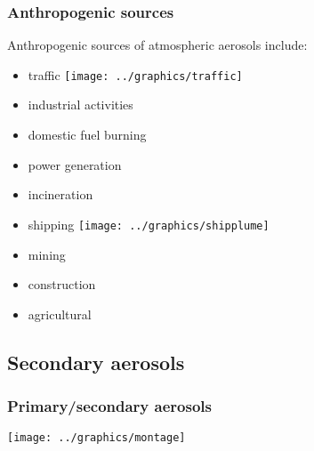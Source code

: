 ﻿\documentclass[ignorenonframetext]{beamer}
\begin{document}
\begin{frame}
\frametitle{Anthropogenic sources}
Anthropogenic sources of atmospheric aerosols include:
\begin{itemize}
\item traffic \hspace{2in} \texttt{[image: ../graphics/traffic]}
\item industrial activities
\item domestic fuel burning
\item power generation
\item incineration
\item shipping \hspace{2in} \texttt{[image: ../graphics/shipplume]}
\item mining
\item construction
\item agricultural
\end{itemize}
\end{frame}

\subsection{Secondary aerosols}

\begin{frame}
\frametitle{Primary/secondary aerosols}
\setlength{\fboxrule}{0.8pt}
\begin{center} \texttt{[image: ../graphics/montage]} \end{center}
\end{frame}
\end{document}
